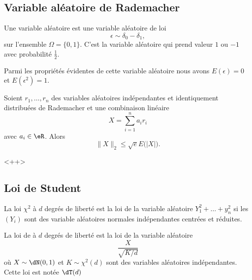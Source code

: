 \subsection{Variable aléatoire de Rademacher}

Une variable aléatoire  est une variable aléatoire de loi
\begin{equation}   
    \epsilon\sim \delta_0-\delta_1,
\end{equation}
sur l'ensemble \( \Omega=\{ 0,1 \}\). C'est la variable aléatoire qui prend valeur \( 1\) ou \( -1\) avec probabilité \( \frac{ 1 }{2}\). 

Parmi les propriétés évidentes de cette variable aléatoire nous avons \( E(\epsilon)=0\) et \( E(\epsilon^2)=1\).

\begin{proposition}  \label{PropCZRNRsf}
    Soient \( r_1,\ldots, r_n\) des variables aléatoires indépendantes et identiquement distribuées de Rademacher et une combinaison linéaire
    \begin{equation}
        X=\sum_{i=1}^na_ir_i
    \end{equation}
    avec \( a_i\in \eR\). Alors
    \begin{equation}
        \| X \|_2\leq \sqrt{e}E\big( |X| \big).
    \end{equation}
\end{proposition}
<++>

\subsection{Loi de Student}

\begin{definition}
    La loi \( \chi^2\) à \( d\) degrés de liberté est la loi de la variable aléatoire \( Y_1^2+\ldots+y_n^2\) si les \( (Y_i)\) sont des variable aléatoires normales indépendantes centrées et réduites.

    La loi de  à \( d\) degrés de liberté est la loi de la variable aléatoire
    \begin{equation}
        \frac{ X }{ \sqrt{K/d} }
    \end{equation}
    où \( X\sim\dN(0,1)\) et \( K\sim\chi^2(d)\) sont des variables aléatoires indépendantes. Cette loi est notée \( \dT(d)\)
\end{definition}

